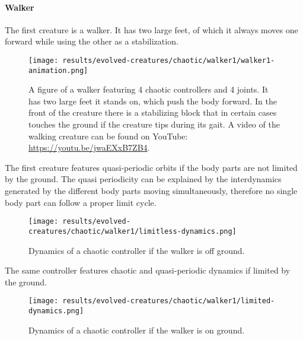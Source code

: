 \documentclass[main]{subfiles}
\begin{document}
\paragraph{Walker}

The first creature is a walker. It has two large feet, of which it always moves one forward while using the other as a stabilization. 

\begin{figure}[H]
\centering
\texttt{[image: results/evolved-creatures/chaotic/walker1/walker1-animation.png]}
\caption[Figure of a walker using chaotic controllers.]{A figure of a walker featuring 4 chaotic controllers and 4 joints. It has two large feet it stands on, which push the body forward. In the front of the creature there is a stabilizing block that in certain cases touches the ground if the creature tips during its gait. A video of the walking creature can be found on YouTube: \url{https://youtu.be/jwaEXxB7ZB4}.}
\label{figure:successfulcreatures-chaotic-walker1}
\end{figure}

The first creature features quasi-periodic orbits if the body parts are not limited by the ground. %
%
The quasi periodicity can be explained by the interdynamics generated by the different body parts moving simultaneously, therefore no single body part can follow a proper limit cycle. %

\begin{figure}[H]
\centering
\texttt{[image: results/evolved-creatures/chaotic/walker1/limitless-dynamics.png]}
\caption[Off ground controller dynamics of the walker]{Dynamics of a chaotic controller if the walker is off ground.}
\label{figure:walker1-off-ground-controller-dynamics}
\end{figure}

The same controller features chaotic and quasi-periodic dynamics if limited by the ground. %

\begin{figure}[H]
\centering
\texttt{[image: results/evolved-creatures/chaotic/walker1/limited-dynamics.png]}
\caption[On ground controller dynamics of the walker]{Dynamics of a chaotic controller if the walker is on ground.}
\label{figure:walker1-on-ground-controller-dynamics}
\end{figure}
\end{document}
